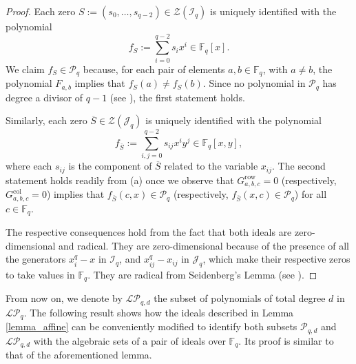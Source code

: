\documentclass[pdflatex,sn-mathphys-num]{sn-jnl}
\theoremstyle{thmstyleone}%
\begin{document}
\begin{proof} Each zero $S:=(s_0,\ldots,s_{q-2})\in \mathcal{Z}(\mathcal{I}_q)$ is uniquely identified with the polynomial 
\[f_S:=\sum_{i=0}^{q-2}s_ix^i \in \mathbb{F}_q[x].\]
We claim $f_S\in\mathcal{P}_q$ because, for each pair of elements $a,b\in \mathbb{F}_q$, with $a\neq b$, the polynomial $F_{a,b}$ implies that $f_S(a)\neq f_S(b)$. Since no polynomial in $\mathcal{P}_q$ has degree a divisor of $q-1$ (see \cite{Lidl1997}), the first statement holds.

Similarly, each zero $\overline{S}\in \mathcal{Z}\left(\mathcal{J}_q\right)$ is uniquely identified with the polynomial 
\[f_{\overline{S}}:=\sum_{i,j=0}^{q-2}s_{ij}x^iy^j\in \mathbb{F}_q[x,y],\]
where each $s_{ij}$ is the component of $\overline{S}$ related to the variable $x_{ij}$. The second statement holds readily from (a) once we observe that $G^{\mathrm{row}}_{a,b,c}=0$ (respectively, $G^{\mathrm{col}}_{a,b,c}=0$) implies that $f_{\overline{S}}(c,x)\in \mathcal{P}_q$ (respectively, $f_{\overline{S}}(x,c)\in \mathcal{P}_q$) for all $c\in \mathbb{F}_q$.

The respective consequences hold from the fact that both ideals are zero-dimensional and radical. They are zero-dimensional because of the presence of all the generators $x_i^q-x$ in $\mathcal{I}_q$, and $x_{ij}^q-x_{ij}$ in $\mathcal{J}_q$, which make their respective zeros to take values in $\mathbb{F}_q$. They are radical from Seidenberg's Lemma (see \cite[Proposition 3.7.15]{Kreuzer2000}). 
\end{proof}

\vspace{0.2cm}

From now on, we denote by $\mathcal{LP}_{q,d}$ the subset of polynomials of total degree $d$ in $\mathcal{LP}_q$. The following result shows how the ideals described in Lemma \ref{lemma_affine} can be conveniently modified to identify both subsets $\mathcal{P}_{q,d}$ and $\mathcal{LP}_{q,d}$ with the algebraic sets of a pair of ideals over $\mathbb{F}_q$. Its proof is similar to that of the aforementioned lemma.
\end{document}
